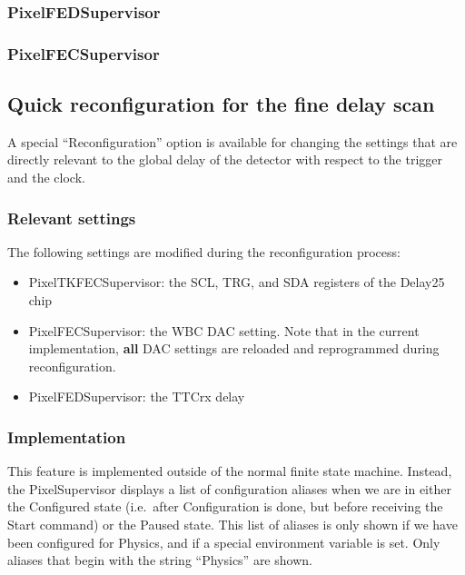 \subsubsection{PixelFEDSupervisor}

\subsubsection{PixelFECSupervisor}



\subsection{Quick reconfiguration for the fine delay scan}

A special ``Reconfiguration'' option is available for changing the
settings that are directly relevant to the global delay of the
detector with respect to the trigger and the clock.

\subsubsection{Relevant settings}

The following settings are modified during the reconfiguration process:
\begin{itemize}
\item PixelTKFECSupervisor: the SCL, TRG, and SDA registers of the Delay25 chip
\item PixelFECSupervisor: the WBC DAC setting. Note that in the current implementation, {\bf all} DAC settings are reloaded and reprogrammed during reconfiguration.
\item PixelFEDSupervisor: the TTCrx delay
\end{itemize}

\subsubsection{Implementation}

This feature is implemented outside of the normal finite state
machine. Instead, the PixelSupervisor displays a list of configuration
aliases when we are in either the Configured state (i.e.\ after
Configuration is done, but before receiving the Start command) or the
Paused state. This list of aliases is only shown if we have been
configured for Physics, and if a special environment variable is
set. Only aliases that begin with the string ``Physics'' are shown.

